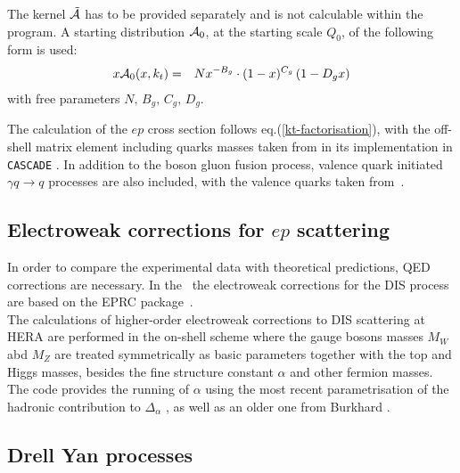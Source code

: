 The kernel ${\cal \tilde A}$ has to be provided separately and is not
 calculable within the program. A starting distribution  ${\cal A}_0$, 
 at the starting scale $Q_0$, of the following form is used:
\begin{eqnarray}
x{\cal A}_0(x,\kt) &=& N x^{-B_g} \cdot (1 -x)^{C_g}\left( 1 -D_g x\right) 
\label{a0}
\end{eqnarray}
with free parameters $N,\, B_g,\, C_g,\, D_g$. 

The calculation of the $ep$ cross section follows eq.(\ref{kt-factorisation}), 
with the off-shell matrix element including quarks masses taken from \cite{Catani:1990eg} 
in its implementation in {\tt CASCADE} \cite{Jung:2010si}.
In addition to the boson gluon fusion process, valence quark initiated 
$\gamma q\to q$ processes are also included, with the valence quarks taken from~\cite{Deak:2010gk}.


%       
\subsection{Electroweak corrections for \texorpdfstring{$ep$}{ep} scattering} 
 
In order to compare the experimental data with theoretical predictions, 
QED corrections are necessary. In the \fitter\, the electroweak corrections 
for the DIS process are based on the EPRC package~\cite{SpiesbergerPrivComm}.
\\
The calculations of higher-order electroweak corrections to DIS scattering at HERA are performed
in the on-shell scheme where the gauge bosons masses $M_W$ abd $M_Z$ are treated symmetrically
as basic parameters together with the top and Higgs masses, besides the fine structure constant 
$\alpha$ and other fermion masses.
\\
The code provides the running of $\alpha$ using the most recent parametrisation
of the hadronic contribution to $\Delta_\alpha$ \cite{Jegerlehner}, as well as an older 
one from Burkhard \cite{Burkhard}.

\subsection{Drell Yan processes}

